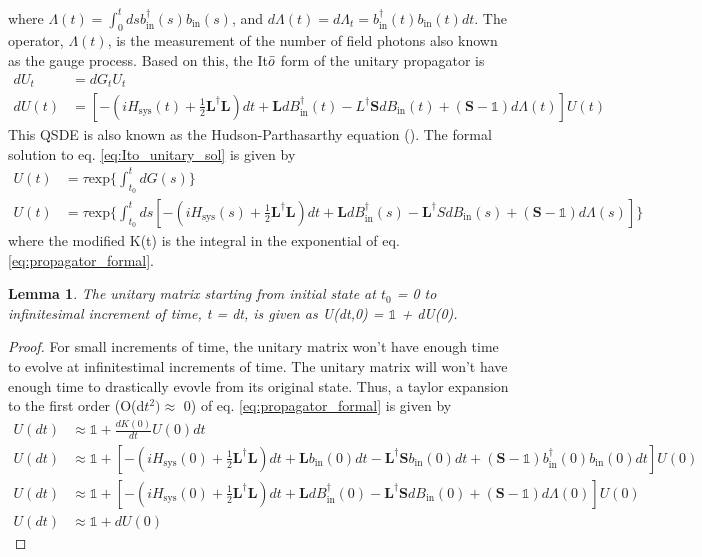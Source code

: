 \documentclass[a4paper]{article}
\newtheorem{lemma}{Lemma}[section]
\theoremstyle{definition}
\begin{document}
where $\Lambda(t) = \int_0^t ds b^\dagger_{\text{in}}(s)b_{\text{in}}(s)$, and $d\Lambda(t) = d\Lambda_t = b^\dagger_{\text{in}}(t)b_{\text{in}}(t) dt$. The operator, $\Lambda(t)$, is the measurement of the number of field photons also known as the gauge process. Based on this, the It$\Bar{o}$ form of the unitary propagator is 
\begin{align}
\label{eq:Ito_unitary_sol}
    dU_t & =  dG_t U_t \nonumber \\
    dU(t)& =  [-(iH_{\text{sys}}(t) + \frac{1}{2}\textbf{L}^\dagger \textbf{L})dt + \textbf{L} dB^\dagger_\text{in}(t) - L^\dagger \textbf{S}dB_\text{in}(t) + (\textbf{S}-\mathbb{1})d\Lambda(t)] U(t)
\end{align}
This QSDE is also known as the Hudson-Parthasarthy equation (\cite{Fagnola_2019,Gough_2008, Hudson1984}). The formal solution to eq. \ref{eq:Ito_unitary_sol} is given by
\begin{align}
\label{eq:propagator_formal}
    U(t) & = \tau \text{exp}\{\int_{t_0}^t dG(s)\} \nonumber \\
    U(t) & = \tau \text{exp}\{\int_{t_0}^t ds[-(iH_{\text{sys}}(s) + \frac{1}{2}\textbf{L}^\dagger \textbf{L})dt + \textbf{L} dB^\dagger_\text{in}(s) - \textbf{L}^\dagger SdB_\text{in}(s) + (\textbf{S}-\mathbb{1})d\Lambda(s)] \}
\end{align}
where the modified K(t) is the integral in the exponential of eq. \ref{eq:propagator_formal}.
\begin{lemma}
The unitary matrix starting from initial state at $t_0$ = 0 to infinitesimal increment of time, t = dt, is given as U(dt,0) = $\mathbb{1}$ + dU(0).
\end{lemma}
\begin{proof}
For small increments of time, the unitary matrix won't have enough time to evolve at infinitestimal increments of time. The unitary matrix will won't have enough time to drastically evovle from its original state. Thus, a taylor expansion to the first order (O(d$t^2) \approx$ 0) of eq. \ref{eq:propagator_formal} is given by
\begin{align}
    U(dt) & \approx \mathbb{1} +  \frac{dK(0)}{dt}U(0)dt \nonumber \\
     U(dt) & \approx  \mathbb{1} + [-(iH_{\text{sys}}(0) + \frac{1}{2}\textbf{L}^\dagger \textbf{L})dt +  \textbf{L}b_{\text{in}}(0)dt-\textbf{L}^\dagger \textbf{S} b_{\text{in}}(0)dt + (\textbf{S}-\mathbb{1})b^\dagger_{\text{in}}(0)b_{\text{in}}(0)dt]U(0) \nonumber \\
     U(dt) & \approx \mathbb{1} + [-(iH_{\text{sys}}(0) + \frac{1}{2}\textbf{L}^\dagger \textbf{L})dt + \textbf{L} dB^\dagger_\text{in}(0) - \textbf{L}^\dagger \textbf{S}dB_\text{in}(0) + (\textbf{S}-\mathbb{1})d\Lambda(0)] U(0) \nonumber \\
     U(dt) & \approx \mathbb{1} + dU(0)
\end{align}

\end{proof}
\end{document}
